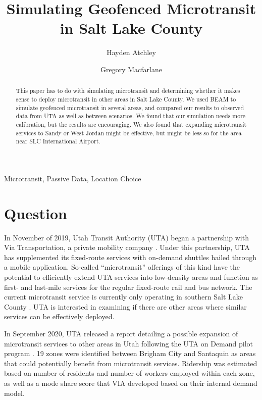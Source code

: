 \documentclass[3p, authoryear]{elsarticle} %
\begin{document}
\begin{frontmatter}

  \title{Simulating Geofenced Microtransit in Salt Lake County}
    \author[Brigham Young University]{Hayden Atchley}
    \author[Brigham Young University]{Gregory Macfarlane}
      \address[Brigham Young University]{Civil and Construction Engineering Department, 430 Engineering Building, Provo, Utah 84602}
    
  \begin{abstract}
  This paper has to do with simulating microtransit and determining whether it makes sense to deploy microtransit in other areas in Salt Lake County. We used BEAM to simulate geofenced microtransit in several areas, and compared our results to observed data from UTA as well as between scenarios. We found that our simulation needs more calibration, but the results are encouraging. We also found that expanding microtransit services to Sandy or West Jordan might be effective, but might be less so for the area near SLC International Airport.
  \end{abstract}
   \begin{keyword} Microtransit, Passive Data, Location Choice\end{keyword}
 \end{frontmatter}

\hypertarget{question}{%
\section{Question}\label{question}}

In November of 2019, Utah Transit Authority (UTA) began a partnership with Via Transportation, a private mobility company \citep{UTAreport}.
Under this partnership, UTA has supplemented its fixed-route services with on-demand shuttles hailed through a mobile application.
So-called ``microtransit'' offerings of this kind have the potential to efficiently extend UTA services into low-density areas and function as first- and last-mile services for the regular fixed-route rail and bus network.
The current microtransit service is currently only operating in southern Salt Lake County \citep{UTAonDemand}.
UTA is interested in examining if there are other areas where similar services can be effectively deployed.

In September 2020, UTA released a report detailing a possible expansion of microtransit services to other areas in Utah following the UTA on Demand pilot program \citep{UTAreport}.
19 zones were identified between Brigham City and Santaquin as areas that could potentially benefit from microtransit services.
Ridership was estimated based on number of residents and number of workers employed within each zone, as well as a mode share score that VIA developed based on their internal demand model.
\end{document}
